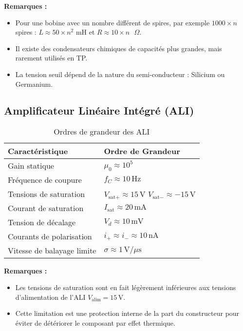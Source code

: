 \documentclass[10pt]{article}
\begin{document}
\begin{multicols}{2}
\textbf{Remarques :}
\begin{itemize}
    \item Pour une bobine avec un nombre différent de spires, par exemple \(1000 \times n\) spires : \(L \approx 50 \times n^2 \text{ mH}\) et \(R \approx 10 \times n \text{ }\Omega\).
    \item Il existe des condensateurs chimiques de capacités plus grandes, mais rarement utilisés en TP.
    \item La tension seuil dépend de la nature du semi-conducteur : Silicium ou Germanium.
\end{itemize}

\subsection{Amplificateur Linéaire Intégré (ALI)}

\begin{table}[H]
\centering
\caption{Ordres de grandeur des ALI}
\begin{tabular}{|l|l|}
\hline
\textbf{Caractéristique} & \textbf{Ordre de Grandeur} \\ \hline
Gain statique & \(\mu_0 \approx 10^5\) \\ \hline
Fréquence de coupure & \(f_C \approx 10\,\text{Hz}\) \\ \hline
Tensions de saturation & \(V_{\text{sat}+} \approx 15\,\text{V}\) \newline \(V_{\text{sat}-} \approx -15\,\text{V}\) \\ \hline
Courant de saturation & \(I_{\text{sat}} \approx 20\,\text{mA}\) \\ \hline
Tension de décalage & \(V_d \approx 10\,\text{mV}\) \\ \hline
Courants de polarisation & \(i_+ \approx i_- \approx 10\,\text{nA}\) \\ \hline
Vitesse de balayage limite & \(\sigma \approx 1\,\text{V}/\mu\text{s}\) \\ \hline
\end{tabular}
\end{table}

\textbf{Remarques :}
\begin{itemize}
    \item Les tensions de saturation sont en fait légèrement inférieures aux tensions d’alimentation de l’ALI \(V_{\text{alim}} = 15\,\text{V}\).
    \item Cette limitation est une protection interne de la part du constructeur pour éviter de détériorer le composant par effet thermique.
\end{itemize}


\end{multicols}
\end{document}
